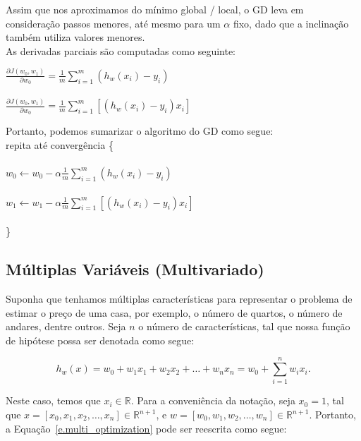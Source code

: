  Assim que nos aproximamos do mínimo global / local, o GD leva em consideração passos menores, até mesmo para um $\alpha$ fixo, dado que a inclinação também utiliza valores menores. \\
 
 As derivadas parciais são computadas como seguinte:
 
 \begin{center}
 $\frac{\partial J(w_0, w_1)}{\partial w_0} = \frac{1}{m} \sum_{i=1}^{m}(h_w(x_i) - y_i)$ \\~\\
 
  $\frac{\partial J(w_0, w_1)}{\partial w_0} = \frac{1}{m} \sum_{i=1}^{m}[(h_w(x_i) - y_i)x_i]$ \\
 \end{center}
 
 Portanto, podemos sumarizar o algoritmo do GD como segue: \\
 
 repita até convergência \{ \\ \\
 \hspace*{25pt} $w_0 \leftarrow w_0 - \alpha \frac{1}{m} \sum_{i=1}^{m}(h_w(x_i) - y_i)$ \\~\\
 \hspace*{25pt} $w_1 \leftarrow w_1 - \alpha \frac{1}{m} \sum_{i=1}^{m}[(h_w(x_i) - y_i)x_i]$ \\ \\
 \hspace*{15pt} \}
 
\subsection{Múltiplas Variáveis (Multivariado)}
\label{ss.multi_variables}

Suponha que tenhamos múltiplas características para representar o problema de estimar o preço de uma casa, por exemplo, o número de quartos, o número de andares, dentre outros. Seja $n$ o número de características, tal que nossa função de hipótese possa ser denotada como segue:

\begin{equation}
\label{e.multi_optimization}
h_w(x) = w_0 + w_1x_1 + w_2x_2 + \dots + w_nx_n
= w_0 + \sum\limits_{i = 1}^n w_ix_i.
\end{equation}

Neste caso, temos que $x_i \in \mathbb{R}$. Para a conveniência da notação, seja $x_0 = 1$, tal que $x = [x_0, x_1, x_2, \dots, x_n] \in \mathbb{R}^{n+1}$, e $w = [w_0, w_1, w_2, \dots, w_n] \in \mathbb{R}^{n+1}$. Portanto, a Equação~\ref{e.multi_optimization} pode ser reescrita como segue:

